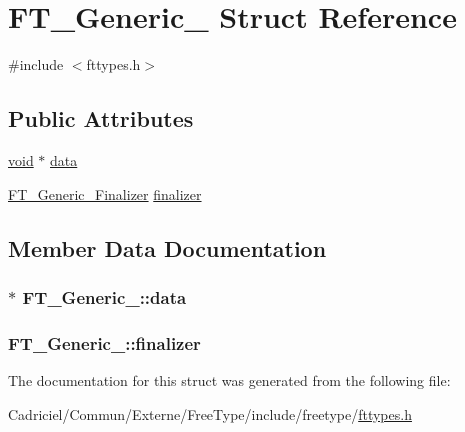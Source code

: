 \hypertarget{struct_f_t___generic__}{\section{F\-T\-\_\-\-Generic\-\_\- Struct Reference}
\label{struct_f_t___generic__}
}


{\ttfamily \#include $<$fttypes.\-h$>$}

\subsection*{Public Attributes}
\begin{DoxyCompactItemize}
\item 
\hyperlink{wglew_8h_aeea6e3dfae3acf232096f57d2d57f084}{void} $\ast$ \hyperlink{struct_f_t___generic___af0bf8b983254b662f293e9a20505e27e}{data}
\item 
\hyperlink{fttypes_8h_a8ca4797cb3ccca807d7ecfcb49f0c491}{F\-T\-\_\-\-Generic\-\_\-\-Finalizer} \hyperlink{struct_f_t___generic___a20fce8de90cc9e3876935817247b9ccc}{finalizer}
\end{DoxyCompactItemize}


\subsection{Member Data Documentation}
\hypertarget{struct_f_t___generic___af0bf8b983254b662f293e9a20505e27e}{
\subsubsection[{data}]{$\ast$ F\-T\-\_\-\-Generic\-\_\-\-::data}}\label{struct_f_t___generic___af0bf8b983254b662f293e9a20505e27e}
\hypertarget{struct_f_t___generic___a20fce8de90cc9e3876935817247b9ccc}{
\subsubsection[{finalizer}]{ F\-T\-\_\-\-Generic\-\_\-\-::finalizer}}\label{struct_f_t___generic___a20fce8de90cc9e3876935817247b9ccc}


The documentation for this struct was generated from the following file\-:\begin{DoxyCompactItemize}
\item 
Cadriciel/\-Commun/\-Externe/\-Free\-Type/include/freetype/\hyperlink{fttypes_8h}{fttypes.\-h}\end{DoxyCompactItemize}

